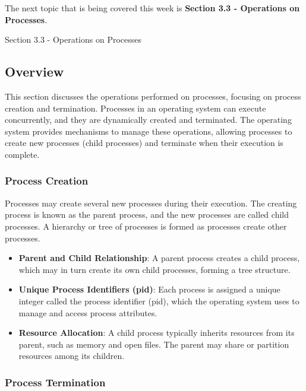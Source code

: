 The next topic that is being covered this week is \textbf{Section 3.3 - Operations on Processes}.

\begin{notes}{Section 3.3 - Operations on Processes}
    \subsection*{Overview}

    This section discusses the operations performed on processes, focusing on process creation and termination. Processes in an operating system can execute concurrently, and they are dynamically 
    created and terminated. The operating system provides mechanisms to manage these operations, allowing processes to create new processes (child processes) and terminate when their execution is complete.
    
    \subsubsection*{Process Creation}
    
    Processes may create several new processes during their execution. The creating process is known as the parent process, and the new processes are called child processes. A hierarchy or tree of 
    processes is formed as processes create other processes.
    
    \begin{highlight}
    
        \begin{itemize}
            \item \textbf{Parent and Child Relationship}: A parent process creates a child process, which may in turn create its own child processes, forming a tree structure.
            \item \textbf{Unique Process Identifiers (pid)}: Each process is assigned a unique integer called the process identifier (pid), which the operating system uses to manage and access process attributes.
            \item \textbf{Resource Allocation}: A child process typically inherits resources from its parent, such as memory and open files. The parent may share or partition resources among its children.
        \end{itemize}
    
    \end{highlight}
    
    \subsubsection*{Process Termination}
    

\end{notes}
